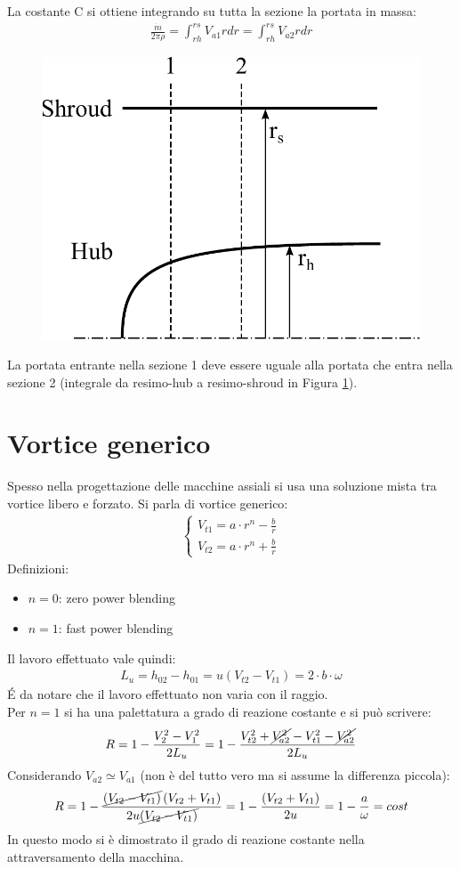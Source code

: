La costante C si ottiene integrando su tutta la sezione la portata in massa:
\begin{align*}
\frac{\dot{m}}{2 \pi \rho} = \int_{rh}^{rs} V_{a1} r dr = \int_{rh}^{rs} V_{a2} r dr
\end{align*}
\begin{figure}[h]
\centering
  \includegraphics[width=.4\textwidth]{fig/HubShroud.pdf}
\caption{}
\label{fig:hubshroud}
\end{figure}
La portata entrante nella sezione 1 deve essere uguale alla portata che entra nella sezione 2 (integrale da resimo-hub a resimo-shroud in Figura \ref{fig:hubshroud}).
\section{Vortice generico}
Spesso nella progettazione delle macchine assiali si usa una soluzione mista tra vortice libero e forzato. Si parla di vortice generico:
\begin{align*}
\begin{cases}
V_{t1} = a \cdot r^n - \frac{b}{r}\\
V_{t2} = a \cdot r^n + \frac{b}{r}
\end{cases}
\end{align*}
Definizioni:
\begin{itemize}
\item $n=0$: zero power blending
\item $n=1$: fast power blending
\end{itemize}
Il lavoro effettuato vale quindi:
\begin{align*}
L_u = h_{02} - h_{01} = u \left( V_{t2} - V_{t1} \right) = 2 \cdot b \cdot \omega
\end{align*}
\'E da notare che il lavoro effettuato non varia con il raggio.\\
Per $n=1$ si ha una palettatura a grado di reazione costante e si può scrivere:
\begin{align*}
R = 1 - \frac{V_2^2 - V_1^2}{2 L_u} = 1 - \frac{V_{t2}^2 + \cancel{V_{a2}^2} - V_{t1}^2 - \cancel{V_{a2}^2}}{2 L_u}
\end{align*}
Considerando $V_{a2} \simeq V_{a1}$ (non è del tutto vero ma si assume la differenza piccola):
\begin{align*}
R = 1 - \frac{\cancel{\left( V_{t2} - V_{t1} \right)} \left( V_{t2}+ V_{t1} \right)}{2 u \cancel{\left( V_{t2}- V_{t1} \right)}} = 1- \frac{\left( V_{t2}+ V_{t1} \right)}{2 u} = 1-\frac{a}{\omega} = cost
\end{align*}
In questo modo si è dimostrato il grado di reazione costante nella attraversamento della macchina.
